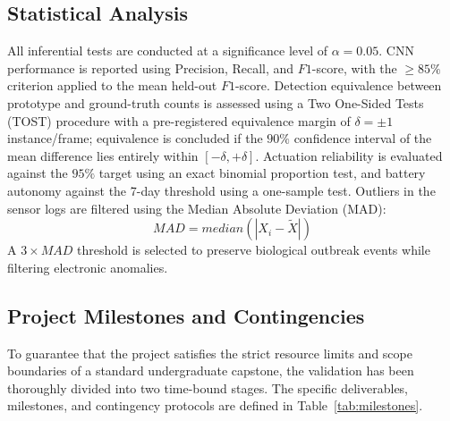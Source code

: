 \documentclass[conference]{IEEEtran}
\begin{document}
\subsection{Statistical Analysis}
All inferential tests are conducted at a significance level of $\alpha = 0.05$. CNN performance is reported using Precision, Recall, and $F1$-score, with the $\geq 85\%$ criterion applied to the mean held-out $F1$-score. Detection equivalence between prototype and ground-truth counts is assessed using a Two One-Sided Tests (TOST) procedure with a pre-registered equivalence margin of $\delta = \pm 1$ instance/frame; equivalence is concluded if the $90\%$ confidence interval of the mean difference lies entirely within $[-\delta, +\delta]$. Actuation reliability is evaluated against the $95\%$ target using an exact binomial proportion test, and battery autonomy against the 7-day threshold using a one-sample test. Outliers in the sensor logs are filtered using the Median Absolute Deviation (MAD):
\begin{equation}
MAD = median(|X_i - \tilde{X}|)
\end{equation}
A $3 \times MAD$ threshold is selected to preserve biological outbreak events while filtering electronic anomalies.

\subsection{Project Milestones and Contingencies}
To guarantee that the project satisfies the strict resource limits and scope boundaries of a standard undergraduate capstone, the validation has been thoroughly divided into two time-bound stages. The specific deliverables, milestones, and contingency protocols are defined in Table~\ref{tab:milestones}.
\end{document}
